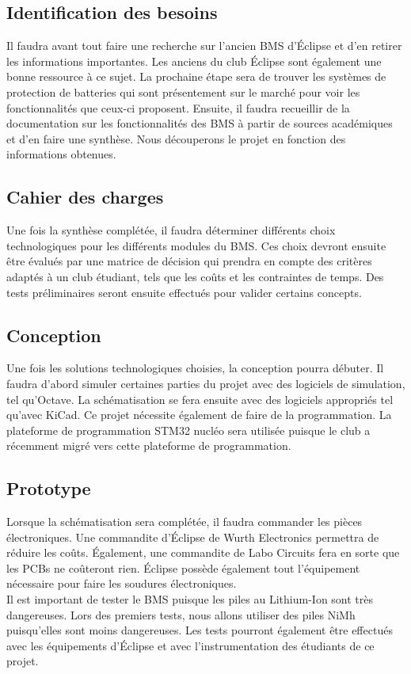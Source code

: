 \subsection{Identification des besoins}
Il faudra avant tout faire une recherche sur l’ancien BMS d’Éclipse et d’en retirer les informations importantes. Les anciens du club Éclipse sont également une bonne ressource à ce sujet. La prochaine étape sera de trouver les systèmes de protection de batteries qui sont présentement sur le marché pour voir les fonctionnalités que ceux-ci proposent. Ensuite, il faudra recueillir de la documentation sur les fonctionnalités des BMS à partir de sources académiques et d’en faire une synthèse. Nous découperons le projet en fonction des informations obtenues. 

\subsection{Cahier des charges}
Une fois la synthèse complétée, il faudra déterminer différents choix technologiques pour les différents modules du BMS. Ces choix devront ensuite être évalués par une matrice de décision qui prendra en compte des critères adaptés à un club étudiant, tels que les coûts et les contraintes de temps. Des tests préliminaires seront ensuite effectués pour valider certains concepts.

\subsection{Conception}
Une fois les solutions technologiques choisies, la conception pourra débuter. Il faudra d’abord simuler certaines parties du projet avec des logiciels de simulation, tel qu’Octave. La schématisation se fera ensuite avec des logiciels appropriés tel qu’avec KiCad. Ce projet nécessite également de faire de la programmation. La plateforme de programmation STM32 nucléo sera utilisée puisque le club a récemment migré vers cette plateforme de programmation.

\subsection{Prototype}
Lorsque la schématisation sera complétée, il faudra commander les pièces électroniques. Une commandite d’Éclipse de Wurth Electronics permettra de réduire les coûts. Également, une commandite de Labo Circuits fera en sorte que les PCBs ne coûteront rien. Éclipse possède également tout l’équipement nécessaire pour faire les soudures électroniques. \\
 
Il est important de tester le BMS puisque les piles au Lithium-Ion sont très dangereuses. Lors des premiers tests, nous allons utiliser des piles NiMh puisqu’elles sont moins dangereuses. Les tests pourront également être effectués avec les équipements d’Éclipse et avec l’instrumentation des étudiants de ce projet.